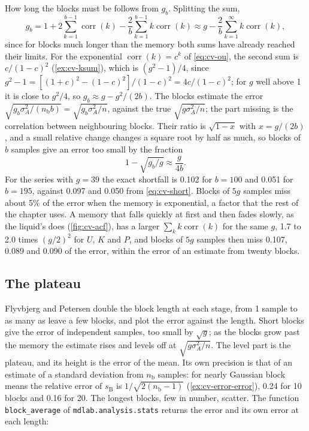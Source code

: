 How long the blocks must be follows from $g_b$. Splitting the sum,
\begin{equation*}
   g_b = 1 + 2\sum_{k=1}^{b-1}\operatorname{corr}(k)
   - \frac2b\sum_{k=1}^{b-1}k\operatorname{corr}(k)
   \approx g - \frac2b\sum_{k=1}^{\infty}k\operatorname{corr}(k) ,
\end{equation*}
since for blocks much longer than the memory both sums have already
reached their limits. For the exponential $\operatorname{corr}(k) = c^k$
of \cref{eq:cv-ou}, the second sum is $c/(1 - c)^2$ (\cref{ex:cv-ksum}),
which is $(g^2 - 1)/4$, since $g^2 - 1 = [(1 + c)^2 - (1 - c)^2]/(1 - c)^2
= 4c/(1 - c)^2$; for $g$ well above 1 it is close to $g^2/4$, so $g_b
\approx g - g^2/(2b)$. The blocks estimate the error
$\sqrt{g_b\sigma_A^2/(n_{\mathrm b}b)} = \sqrt{g_b\sigma_A^2/n}$, against
the true $\sqrt{g\sigma_A^2/n}$; the part missing is the correlation
between neighbouring blocks. Their ratio is $\sqrt{1 - x}$ with $x =
g/(2b)$, and a small relative change changes a square root by half as
much, so blocks of $b$ samples give an error too small by the fraction
\begin{equation}
   1 - \sqrt{g_b/g} \approx \frac{g}{4b} .
   \label{eq:cv-short}
\end{equation}
For the series with $g = 39$ the exact shortfall is 0.102 for $b = 100$
and 0.051 for $b = 195$, against 0.097 and 0.050 from \cref{eq:cv-short}.
Blocks of $5g$ samples miss about 5\% of the error when the memory is
exponential, a factor that the rest of the chapter uses. A memory that
falls quickly at first and then fades slowly, as the liquid's does
(\cref{fig:cv-acf}), has a larger $\sum_kk\operatorname{corr}(k)$ for the
same $g$, 1.7 to 2.0 times $(g/2)^2$ for $U$, $K$ and $P$, and blocks of
$5g$ samples then miss 0.107, 0.089 and 0.090 of the error, within the
error of an estimate from twenty blocks.

\subsection*{The plateau}

Flyvbjerg and Petersen double the block length at each stage, from 1
sample to as many as leave a few blocks, and plot the error against the
length\cite{Flyvbjerg1989}. Short blocks give the error of independent
samples, too small by $\sqrt g$; as the blocks grow past the memory the
estimate rises and levels off at $\sqrt{g\sigma_A^2/n}$. The level part is
the plateau, and its height is the error of the mean. Its own precision
is that of an estimate of a standard deviation from $n_{\mathrm b}$
samples: for nearly Gaussian block means the relative error of $s_{\mathrm
B}$ is $1/\sqrt{2(n_{\mathrm b} - 1)}$ (\cref{ex:cv-error-error}), 0.24 for
10 blocks and 0.16 for 20. The longest blocks, few in number, scatter.
The function \texttt{block\_average} of \texttt{mdlab.analysis.stats}
returns the error and its own error at each length:

